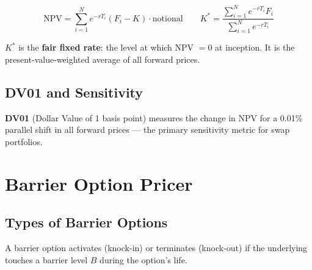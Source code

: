 \documentclass[11pt,a4paper]{article}
\begin{document}
\begin{equation}
\boxed{\mathrm{NPV}=\sum_{i=1}^{N}e^{-rT_i}(F_i-K)\cdot\mathrm{notional}}
\qquad
K^*=\frac{\sum_{i=1}^{N}e^{-rT_i}F_i}{\sum_{i=1}^{N}e^{-rT_i}}
\end{equation}

$K^*$ is the \textbf{fair fixed rate}: the level at which NPV $= 0$ at inception. It is the present-value-weighted average of all forward prices.

\subsection{DV01 and Sensitivity}

\begin{center}
\end{center}

\textbf{DV01} (Dollar Value of 1 basis point) measures the change in NPV for a 0.01\% parallel shift in all forward prices --- the primary sensitivity metric for swap portfolios.

\section{Barrier Option Pricer}

\subsection{Types of Barrier Options}

A barrier option activates (knock-in) or terminates (knock-out) if the underlying touches a barrier level $B$ during the option's life.
\end{document}
